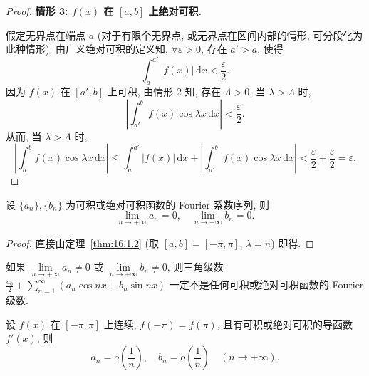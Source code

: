 \begin{proof}
\textbf{情形 3: $f(x)$ 在 $[a,b]$ 上绝对可积.}

假定无界点在端点 $a$ (对于有限个无界点, 或无界点在区间内部的情形, 可分段化为此种情形). 由广义绝对可积的定义知, $\forall\varepsilon>0$, 存在 $a'>a$, 使得
\[
  \int_{a}^{a'}|f(x)|\,\mathrm{d}x<\frac{\varepsilon}{2}.
\]
因为 $f(x)$ 在 $[a',b]$ 上可积, 由情形 2 知, 存在 $\Lambda>0$, 当 $\lambda>\Lambda$ 时,
\[
  \left|\int_{a'}^{b}f(x)\cos\lambda x\,\mathrm{d}x\right|<\frac{\varepsilon}{2}.
\]
从而, 当 $\lambda>\Lambda$ 时,
\[
  \left|\int_{a}^{b}f(x)\cos\lambda x\,\mathrm{d}x\right|\leqslant\int_{a}^{a'}|f(x)|\,\mathrm{d}x+\left|\int_{a'}^{b}f(x)\cos\lambda x\,\mathrm{d}x\right|<\frac{\varepsilon}{2}+\frac{\varepsilon}{2}=\varepsilon.
\]
\end{proof}

\begin{theorem}\label{thm:16.1.3}
设 $\{a_{n}\}, \{b_{n}\}$ 为可积或绝对可积函数的 Fourier 系数序列, 则
\[
  \lim_{n\to+\infty}a_{n}=0,\quad \lim_{n\to+\infty}b_{n}=0.
\]
\end{theorem}

\begin{proof}
直接由定理~\ref{thm:16.1.2} (取 $[a,b]=[-\pi,\pi]$, $\lambda=n$) 即得.
\end{proof}

\begin{remark}\label{rem:16.1.1}
如果 $\lim\limits_{n\to+\infty}a_{n}\neq 0$ 或 $\lim\limits_{n\to+\infty}b_{n}\neq 0$, 则三角级数 $\displaystyle\frac{a_{0}}{2}+\sum_{n=1}^{\infty}(a_{n}\cos nx+b_{n}\sin nx)$ 一定不是任何可积或绝对可积函数的 Fourier 级数.
\end{remark}

\begin{theorem}\label{thm:16.1.4}
设 $f(x)$ 在 $[-\pi,\pi]$ 上连续, $f(-\pi)=f(\pi)$, 且有可积或绝对可积的导函数 $f'(x)$, 则
\[
  a_{n}=o\left(\frac{1}{n}\right),\quad b_{n}=o\left(\frac{1}{n}\right)\quad(n\to+\infty).
\]
\end{theorem}

